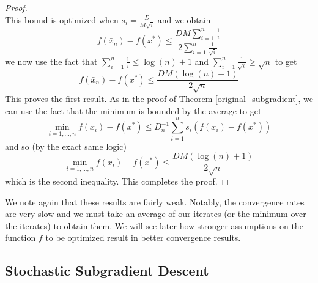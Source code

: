 \begin{proof}
\begin{equation}
 \end{equation}
 This bound is optimized when $s_i = \frac{D}{M\sqrt{i}}$ and we obtain
 \begin{equation}
  f(\bar{x}_n) - f(x^*) \leq \frac{DM\displaystyle\sum_{i=1}^n \frac{1}{i}}{2\displaystyle\sum_{i=1}^n \frac{1}{\sqrt{i}}}
 \end{equation}
 we now use the fact that $\displaystyle\sum_{i=1}^n \frac{1}{i} \leq \log(n) + 1$ and $\displaystyle\sum_{i=1}^n \frac{1}{\sqrt{i}} \geq \sqrt{n}$
 to get
 \begin{equation}
  f(\bar{x}_n) - f(x^*) \leq \frac{DM(\log(n) + 1)}{2\sqrt{n}}
 \end{equation}
 This proves the first result. As in the proof of Theorem \ref{original_subgradient}, we can use the fact that the minimum
 is bounded by the average to get
 \begin{equation}
  \min_{i=1,...,n} f(x_i) - f(x^*) \leq D_n^{-1} \displaystyle\sum_{i=1}^n s_i(f(x_i) - f(x^*))
 \end{equation}
 and so (by the exact same logic)
 \begin{equation}
   \min_{i=1,...,n} f(x_i) - f(x^*) \leq \frac{DM(\log(n) + 1)}{2\sqrt{n}}
 \end{equation}
 which is the second inequality. This completes the proof.

\end{proof}

We note again that these results are fairly weak. Notably, the convergence rates are very slow and we must take an average of
our iterates (or the minimum over the iterates) to obtain them. We will see later how stronger assumptions
on the function $f$ to be optimized result in better convergence results. 

\subsection{Stochastic Subgradient Descent}


